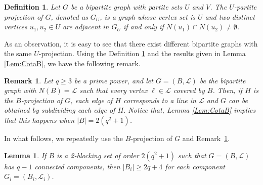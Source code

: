 \documentclass[12pt]{article}
\newtheorem{lemma}[theorem]{Lemma}
\newtheorem{remark}[theorem]{Remark}
\newtheorem{defn}[theorem]{Definition}
\begin{document}
\begin{defn}\label{def:projection}
Let $G$ be a bipartite graph with partite sets $U$ and $V$. The \emph{$U$-partite projection of $G$}, denoted as $G_U$, is a graph whose vertex set is $U$ and two distinct vertices $u_1, u_2 \in U$ are adjacent in $G_U$ if and only if $N(u_1)\cap N(u_2)\neq\emptyset$.     
\end{defn}


As an observation, it is easy to see that there exist different bipartite graphs with the same $U$-projection. Using the Definition \ref{def:projection} and the results given in Lemma \ref{Lem:CotaB}, we have the following remark.

\begin{remark}\label{Rem:B}
    Let $q\ge 3$ be a prime power, and let $G=(B,\mathcal{L})$ be the bipartite graph with $N(B)=\mathcal{L}$ such that every vertex $\ell\in \mathcal{L}$ covered by $B$. Then, if $H$ is the $B$-projection of $G$, each edge of $H$ corresponds to a line in $\mathcal{L}$ and $G$ can be obtained by subdividing each edge of $H$. 
    Notice that, Lemma \ref{Lem:CotaB} implies that this happens when $|B|=2(q^2+1)$. 
 
\end{remark}
{In what follows, we repeatedly use the $B$-projection of $G$ and Remark~\ref{Rem:B}.}

\begin{lemma}\label{Lem:CotaB_q-1}
  If $B$ is a 2-blocking set of order $2(q^2+1)$ such that $G=(B,\mathcal{L})$ has $q-1$ connected components, then $|B_i|\ge2q+4$ for each component $G_i=(B_i,\mathcal{L}_i)$.
\end{lemma}
\end{document}
